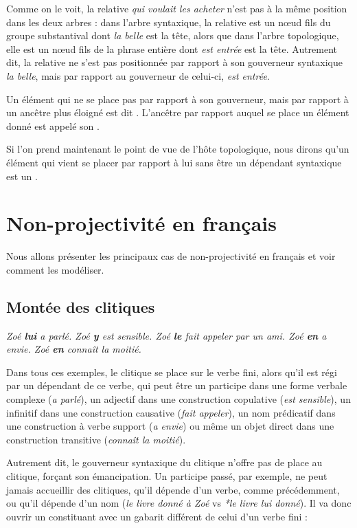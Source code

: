 Comme on le voit, la relative \textit{qui voulait les acheter} n’est pas à la même position dans les deux arbres : dans l’arbre syntaxique, la relative est un nœud fils du groupe substantival dont \textit{la belle} est la tête, alors que dans l’arbre topologique, elle est un nœud fils de la phrase entière dont \textit{est entrée} est la tête. Autrement dit, la relative ne s’est pas positionnée par rapport à son gouverneur syntaxique \textit{la belle}, mais par rapport au gouverneur de celui-ci, \textit{est entrée}.

{Un élément qui ne se place pas par rapport à son gouverneur, mais par rapport à un ancêtre plus éloigné est dit . L’ancêtre par rapport auquel se place un élément donné est appelé son .}

Si l’on prend maintenant le point de vue de l’hôte topologique, nous dirons qu’un élément qui vient se placer par rapport à lui sans être un dépendant syntaxique est un .

\section{Non-projectivité en français}\label{sec:3.5.32}

Nous allons présenter les principaux cas de non-projectivité en français et voir comment les modéliser.

\subsection{Montée des clitiques}
\ea
\ea \itshape Zoé \textbf{lui} a parlé.
\ex \itshape Zoé \textbf{y}   est sensible.
\ex \itshape Zoé \textbf{le}  fait appeler par un ami.
\ex \itshape Zoé \textbf{en}  a envie.
\ex \itshape Zoé \textbf{en}  connaît la moitié.
\z
\z

Dans tous ces exemples, le clitique se place sur le verbe fini, alors qu’il est régi par un dépendant de ce verbe, qui peut être un participe dans une forme verbale complexe (\textit{a parlé}), un adjectif dans une construction copulative (\textit{est sensible}), un infinitif dans une construction causative (\textit{fait appeler}), un nom prédicatif dans une construction à verbe support (\textit{a envie}) ou même un objet direct dans une construction transitive (\textit{connaît la moitié}).

Autrement dit, le gouverneur syntaxique du clitique n’offre pas de place au clitique, forçant son émancipation. Un participe passé, par exemple, ne peut jamais accueillir des clitiques, qu’il dépende d’un verbe, comme précédemment, ou qu’il dépende d’un nom (\textit{le livre donné à Zoé} vs \textit{*le livre lui donné}). Il va donc ouvrir un constituant avec un gabarit différent de celui d’un verbe fini :

